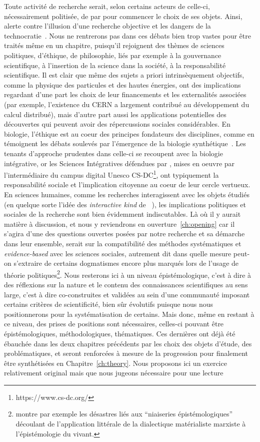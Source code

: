 Toute activité de recherche serait, selon certains acteurs de celle-ci, nécessairement politisée, de par pour commencer le choix de ses objets. Ainsi,  alerte contre l'illusion d'une recherche objective et les dangers de la technocratie~\cite{ripoll2017jig}. Nous ne rentrerons pas dans ces débats bien trop vastes pour être traités même en un chapitre, puisqu'il rejoignent des thèmes de sciences politiques, d'éthique, de philosophie, liés par exemple à la gouvernance scientifique, à l'insertion de la science dans la société, à la responsabilité scientifique. Il est clair que même des sujets a priori intrinsèquement objectifs, comme la physique des particules et des hautes énergies, ont des implications regardant d'une part les choix de leur financements et les externalités associées (par exemple, l'existence du CERN a largement contribué au développement du calcul distribué), mais d'autre part aussi les applications potentielles des découvertes qui peuvent avoir des répercussions sociales considérables. En biologie, l'éthique est au coeur des principes fondateurs des disciplines, comme en témoignent les débats soulevés par l'émergence de la biologie synthétique~\cite{gutmann2011ethics}. Les tenants d'approche prudentes dans celle-ci se recoupent avec la biologie intégrative, or les Sciences Intégratives défendues par , mises en oeuvre par l'intermédiaire du campus digital Unesco CS-DC\footnote{https://www.cs-dc.org/}, ont typiquement la responsabilité sociale et l'implication citoyenne au coeur de leur cercle vertueux. En sciences humaines, comme les recherches interagissent avec les objets étudiés (en quelque sorte l'idée des \emph{interactive kind} de ~\cite{hacking1999social}), les implications politiques et sociales de la recherche sont bien évidemment indiscutables. Là où il y aurait matière à discussion, et nous y reviendrons en ouverture~\ref{ch:opening} car il s'agira d'une des questions ouvertes posées par notre recherche et sa démarche dans leur ensemble, serait sur la compatibilité des méthodes systématiques et \emph{evidence-based} avec les sciences sociales, autrement dit dans quelle mesure peut-on s'extraire de certains dogmatismes encore plus marqués lors de l'usage de théorie politiques\footnote{ montre par exemple les désastres liés aux ``niaiseries épistémologiques'' découlant de l'application littérale de la dialectique matérialiste marxiste à l'épistémologie du vivant.}. Nous resterons ici à un niveau épistémologique, c'est à dire à des réflexions sur la nature et le contenu des connaissances scientifiques au sens large, c'est à dire co-construites et validées au sein d'une communauté imposant certains critères de scientificité, bien sûr évolutifs puisque nous nous positionnerons pour la systématisation de certains. Mais donc, même en restant à ce niveau, des prises de positions sont nécessaires, celles-ci pouvant être épistémologiques, méthodologiques, thématiques. Ces dernières ont déjà été ébauchée dans les deux chapitres précédents par les choix des objets d'étude, des problématiques, et seront renforcées à mesure de la progression pour finalement être synthétisées en Chapitre~\ref{ch:theory}. Nous proposons ici un exercice relativement original mais que nous jugeons nécessaire pour une lecture 